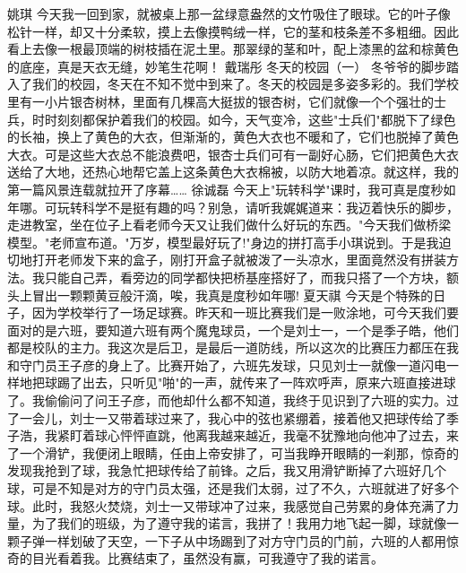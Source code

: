 {}\markdownRendererInterblockSeparator
{}姚琪\markdownRendererInterblockSeparator
{}今天我一回到家，就被桌上那一盆绿意盎然的文竹吸住了眼球。它的叶子像松针一样，却又十分柔软，摸上去像摸鸭绒一样，它的茎和枝条差不多粗细。因此看上去像一根最顶端的树枝插在泥土里。那翠绿的茎和叶，配上漆黑的盆和棕黄色的底座，真是天衣无缝，妙笔生花啊！\markdownRendererInterblockSeparator
{}\markdownRendererInterblockSeparator
{}戴瑞彤\markdownRendererInterblockSeparator
{}冬天的校园（一）\markdownRendererInterblockSeparator
{}冬爷爷的脚步踏入了我们的校园，冬天在不知不觉中到来了。冬天的校园是多姿多彩的。我们学校里有一小片银杏树林，里面有几棵高大挺拔的银杏树，它们就像一个个强壮的士兵，时时刻刻都保护着我们的校园。如今，天气变冷，这些"士兵们"都脱下了绿色的长袖，换上了黄色的大衣，但渐渐的，黄色大衣也不暖和了，它们也脱掉了黄色大衣。可是这些大衣总不能浪费吧，银杏士兵们可有一副好心肠，它们把黄色大衣送给了大地，还热心地帮它盖上这条黄色大衣棉被，以防大地着凉。就这样，我的第一篇风景连载就拉开了序幕……\markdownRendererInterblockSeparator
{}\markdownRendererInterblockSeparator
{}徐诚磊\markdownRendererInterblockSeparator
{}今天上"玩转科学"课时，我可真是度秒如年哪。可玩转科学不是挺有趣的吗？别急，请听我娓娓道来：我迈着快乐的脚步，走进教室，坐在位子上看老师今天又让我们做什么好玩的东西。"今天我们做桥梁模型。"老师宣布道。"万岁，模型最好玩了!"身边的拼打高手小琪说到。于是我迫切地打开老师发下来的盒子，刚打开盒子就被泼了一头凉水，里面竟然没有拼装方法。我只能自己弄，看旁边的同学都快把桥基座搭好了，而我只搭了一个方块，额头上冒出一颗颗黄豆般汗滴，唉，我真是度秒如年哪!\markdownRendererInterblockSeparator
{}\markdownRendererInterblockSeparator
{}夏天祺\markdownRendererInterblockSeparator
{}今天是个特殊的日子，因为学校举行了一场足球赛。昨天和一班比赛我们是一败涂地，可今天我们要面对的是六班，要知道六班有两个魔鬼球员，一个是刘士一，一个是季子皓，他们都是校队的主力。我这次是后卫，是最后一道防线，所以这次的比赛压力都压在我和守门员王子彦的身上了。比赛开始了，六班先发球，只见刘士一就像一道闪电一样地把球踢了出去，只听见"啪"的一声，就传来了一阵欢呼声，原来六班直接进球了。我偷偷问了问王子彦，而他却什么都不知道，我终于见识到了六班的实力。过了一会儿，刘士一又带着球过来了，我心中的弦也紧绷着，接着他又把球传给了季子浩，我紧盯着球心怦怦直跳，他离我越来越近，我毫不犹豫地向他冲了过去，来了一个滑铲，我便闭上眼睛，任由上帝安排了，可当我睁开眼睛的一刹那，惊奇的发现我抢到了球，我急忙把球传给了前锋。之后，我又用滑铲断掉了六班好几个球，可是不知是对方的守门员太强，还是我们太弱，过了不久，六班就进了好多个球。此时，我怒火焚烧，刘士一又带球冲了过来，我感觉自己劳累的身体充满了力量，为了我们的班级，为了遵守我的诺言，我拼了！我用力地飞起一脚，球就像一颗子弹一样划破了天空，一下子从中场踢到了对方守门员的门前，六班的人都用惊奇的目光看着我。比赛结束了，虽然没有赢，可我遵守了我的诺言。\markdownRendererInterblockSeparator
